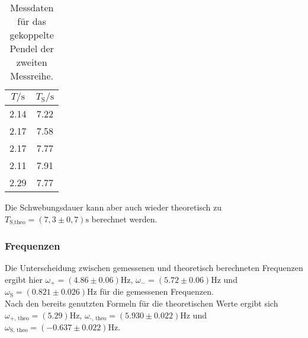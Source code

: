             \begin{table}[ht]
                \centering
                \caption{Messdaten für das gekoppelte Pendel der zweiten Messreihe.}
                \label{tab:gek2}
                \begin{tabular}{c c}
                 \toprule
                 $T / \si{\s}$ & $T_{\text{S}} / \si{\s}$\\
                 \midrule
                 2.14  &  7.22 \\
                 2.17  &  7.58 \\
                 2.17  &  7.77 \\
                 2.11  &  7.91 \\
                 2.29  &  7.77 \\
                 \bottomrule
                \end{tabular}
            \end{table}

            \noindent Die Schwebungsdauer kann aber auch wieder theoretisch zu $T_{\text{S,theo}} = (7,3 \pm 0,7) \si{\second}$ berechnet werden.

        \subsubsection{Frequenzen}

            \noindent Die Unterscheidung zwischen gemessenen und theoretisch berechneten Frequenzen ergibt hier 
            $\omega_{+} = (4.86 \pm 0.06) \si{\hertz}$, $\omega_{-} = (5.72 \pm 0.06) \si{\hertz}$ und 
            $ \omega_{\text{S}}= (0.821 \pm 0.026) \si{\hertz}$ für die gemessenen Frequenzen. \\
            Nach den bereits genutzten Formeln für die theoretischen Werte ergibt sich
            $\omega_\text{+, theo} = (5.29) \si{\hertz}$, $\omega_\text{-, theo} = (5.930 \pm 0.022) \si{\hertz}$ 
            und $\omega_\text{S, theo} = (-0.637 \pm 0.022) \si{\hertz}$.


